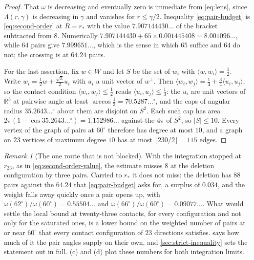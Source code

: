 \documentclass[11pt,reqno]{amsart}
\renewcommand{\_}{\origunderscore\allowbreak}
\numberwithin{equation}{section}
\theoremstyle{plain}
\theoremstyle{definition}
\theoremstyle{remark}
\newtheorem{remark}[thm]{Remark}
\begin{document}
\begin{proof}
That $\omega$ is decreasing and eventually zero is immediate from
\eqref{eq:lens}, since $\Lambda(r,\gamma)$ is decreasing in $\gamma$ and
vanishes for $r\le\gamma/2$. Inequality \eqref{eq:pair-budget} is
\eqref{eq:second-order} at $R=r_*$ with the value $7.907144430\ldots$ of
the bracket subtracted from $8$. Numerically
$7.907144430+65\times0.001445408=8.001096\ldots$, while $64$ pairs
give $7.999651\ldots$, which is the sense in which $65$ suffice and
$64$ do not; the crossing is at $64.24$ pairs.

For the last assertion, fix $w\in W$ and let $S$ be the set of $w_i$
with $\langle w,w_i\rangle=\tfrac12$. Write
$w_i=\tfrac12w+\tfrac{\sqrt3}2u_i$ with $u_i$ a unit vector of
$w^{\perp}$. Then
$\langle w_i,w_j\rangle=\tfrac14+\tfrac34\langle u_i,u_j\rangle$, so the
contact condition $\langle w_i,w_j\rangle\le\tfrac12$ reads
$\langle u_i,u_j\rangle\le\tfrac13$: the $u_i$ are unit vectors of
$\mathbb{R}^3$ at pairwise angle at least
$\arccos\tfrac13=70.5287\ldots^\circ$, and the caps of angular radius
$35.2643\ldots^\circ$ about them are disjoint on $S^2$. Each such cap
has area $2\pi(1-\cos35.2643\ldots^\circ)=1.152986\ldots$ against the
$4\pi$ of $S^2$, so $|S|\le10$. Every vertex of the graph of pairs at
$60^\circ$ therefore has degree at most $10$, and a graph on $23$
vertices of maximum degree $10$ has at most
$\lfloor 230/2\rfloor=115$ edges.
\end{proof}

\begin{remark}[The one route that is not blocked]\label{rem:pair-budget}
With the integration stopped at $r_{23}$, as in
\eqref{eq:second-order-value}, the estimate misses $8$ at the deletion
configuration by three pairs. Carried to $r_*$ it does not miss: the
deletion has $88$ pairs against the $64.24$ that \eqref{eq:pair-budget}
asks for, a surplus of $0.034$, and the weight falls away quickly once a
pair opens up, with $\omega(62^\circ)/\omega(60^\circ)=0.55504\ldots$
and $\omega(66^\circ)/\omega(60^\circ)=0.09077\ldots$. What would
settle the local bound at twenty-three contacts, for every
configuration and not only for the saturated ones, is a lower bound on
the weighted number of pairs at or near $60^\circ$ that every contact
configuration of $23$ directions satisfies. 
says how much of it the pair angles supply on their own, and
\cref{sec:strict-inequality} sets the statement out in full.
(c) and (d) plot these numbers for both integration
limits.
\end{remark}
\end{document}
